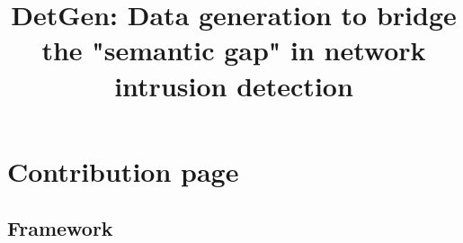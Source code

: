 \documentclass{article}
\begin{document}
\title{DetGen: Data generation to bridge the "semantic gap" in network intrusion detection}

\maketitle


\section*{Contribution page}

\subsection*{Framework}
\end{document}
